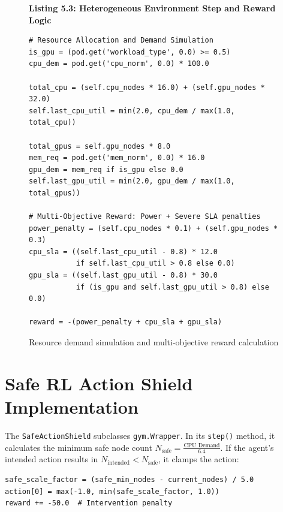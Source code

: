 \documentclass[12pt]{report}
\begin{document}
\begin{figure}[htbp]
\centering
\begin{minipage}{\linewidth}
\begin{framed}
\footnotesize
\textbf{Listing 5.3: Heterogeneous Environment Step and Reward Logic}
\begin{verbatim}
# Resource Allocation and Demand Simulation
is_gpu = (pod.get('workload_type', 0.0) >= 0.5)
cpu_dem = pod.get('cpu_norm', 0.0) * 100.0

total_cpu = (self.cpu_nodes * 16.0) + (self.gpu_nodes * 32.0)
self.last_cpu_util = min(2.0, cpu_dem / max(1.0, total_cpu))

total_gpus = self.gpu_nodes * 8.0
mem_req = pod.get('mem_norm', 0.0) * 16.0
gpu_dem = mem_req if is_gpu else 0.0
self.last_gpu_util = min(2.0, gpu_dem / max(1.0, total_gpus))

# Multi-Objective Reward: Power + Severe SLA penalties
power_penalty = (self.cpu_nodes * 0.1) + (self.gpu_nodes * 0.3)
cpu_sla = ((self.last_cpu_util - 0.8) * 12.0 
           if self.last_cpu_util > 0.8 else 0.0)
gpu_sla = ((self.last_gpu_util - 0.8) * 30.0 
           if (is_gpu and self.last_gpu_util > 0.8) else 0.0)

reward = -(power_penalty + cpu_sla + gpu_sla)
\end{verbatim}
\end{framed}
\end{minipage}
\caption{Resource demand simulation and multi-objective reward calculation}
\label{lst:env_step}
\end{figure}

\section{Safe RL Action Shield Implementation}

The \texttt{SafeActionShield} subclasses \texttt{gym.\allowbreak Wrapper}. In its \texttt{step()} method, it calculates the minimum safe node count $N_{\text{safe}} = \frac{\text{CPU Demand}}{6.4}$. If the agent's intended action results in $N_{\text{intended}} < N_{\text{safe}}$, it clamps the action:

\begin{minipage}{\linewidth}
\begin{framed}
\footnotesize
\begin{verbatim}
safe_scale_factor = (safe_min_nodes - current_nodes) / 5.0
action[0] = max(-1.0, min(safe_scale_factor, 1.0))
reward += -50.0  # Intervention penalty
\end{verbatim}
\end{framed}
\end{minipage}
\end{document}
